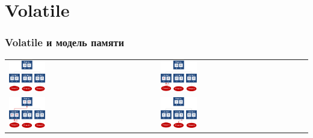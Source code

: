 \documentclass{../../slides-style}
\begin{document}
    \section{Volatile}

    \begin{frame}
        \frametitle{Volatile и модель памяти}
            \begin{center}
                \begin{tabu} {X[1 c p] X[1 c p]}
                    \includegraphics[width=0.25\textwidth]{volatile1.png} & \includegraphics[width=0.25\textwidth]{volatile2.png} \\
                    \includegraphics[width=0.25\textwidth]{volatile3.png} & \includegraphics[width=0.25\textwidth]{volatile4.png} \\
                \end{tabu}
            \end{center}
    \end{frame}
\end{document}
